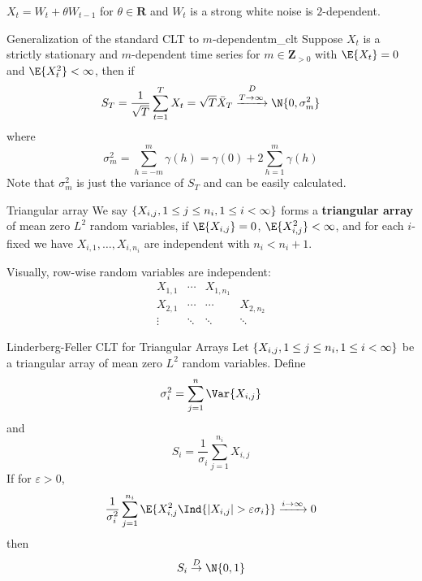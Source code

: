 \begin{Example}{}{}
    $ X_t=W_{t}+\theta W_{t-1} $ for $ \theta\in\mathbf{R} $
    and $ W_{t} $ is a strong white noise is $ 2 $-dependent.
\end{Example}
\begin{Theorem}{Generalization of the standard CLT to $ m $-dependent}{m_clt}
    Suppose $ X_t $ is a strictly stationary
    and $ m $-dependent time series for $ m\in\mathbf{Z}_{>0} $
    with $ \E{X_t}=0 $ and $ \E{X_t^2}<\infty $, then if
    \[ S_T=\frac{1}{\sqrt{T}} \sum_{t=1}^{T}X_t=\sqrt{T}\bar{X}_T
        \stackrel{D}{\xrightarrow{T\to\infty}}\N{0,\sigma_m^2}  \]
    where
    \[ \sigma_m^2=\sum_{h=-m}^{m} \gamma(h)=\gamma(0)+2 \sum_{h=1}^{m} \gamma(h) \]
    Note that $ \sigma_m^2 $ is just the variance of $ S_T $
    and can be easily calculated.
\end{Theorem}
\begin{Definition}{Triangular array}{}
    We say $ \{X_{i,j},1\le j\le n_i,1\le i<\infty\} $ forms a
    \textbf{triangular array} of mean zero $ L^2 $ random
    variables, if $ \E{X_{i,j}}=0 $, $ \E{X_{i,j}^2}<\infty $, and
    for each $ i $-fixed we have $ X_{i,1},\ldots,X_{i,n_i} $
    are independent with $ n_i<n_i+1 $.
\end{Definition}
Visually, row-wise random variables are independent:
\[ \begin{matrix}
        X_{1,1} & \cdots & X_{1,n_1}             \\
        X_{2,1} & \cdots & \cdots    & X_{2,n_2} \\
        \vdots  & \ddots & \ddots    & \ddots
    \end{matrix} \]
\begin{Theorem}{Linderberg-Feller CLT for Triangular Arrays}{}
    Let $ \{X_{i,j},1\le j\le n_i,1\le i<\infty\} $
    be a triangular array of mean zero $ L^2 $ random variables.
    Define
    \[ \sigma_i^2=\sum_{j=1}^{n} \Var{X_{i,j}} \]
    and
    \[ S_i=\frac{1}{\sigma_i} \sum_{j=1}^{n_i} X_{i,j} \]
    If for $ \varepsilon>0 $,
    \[ \frac{1}{\sigma_i^2}\sum_{j=1}^{n_i} \E{X_{i,j}^2
            \Ind{\abs{X_{i,j}}>\varepsilon\sigma_i}}\xrightarrow{i\to\infty}0 \]
    then
    \[ S_i\stackrel{D}{\to}\N{0,1} \]
\end{Theorem}
